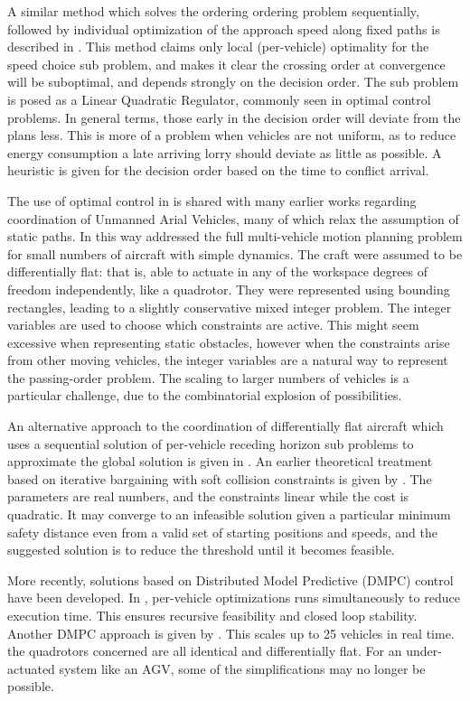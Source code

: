 A similar method which solves the ordering ordering problem sequentially, followed by individual optimization of the approach speed along fixed paths is described in \cite{DeCampos2017}. This method claims only local (per-vehicle) optimality for the speed choice sub problem, and makes it clear the crossing order at convergence will be suboptimal, and depends strongly on the decision order. The sub problem is posed as a Linear Quadratic Regulator, commonly seen in optimal control problems. In general terms, those early in the decision order will deviate from the plans less. This is more of a problem when vehicles are not uniform, as to reduce energy consumption a late arriving lorry should deviate as little as possible. A heuristic is given for the decision order based on the time to conflict arrival.

The use of optimal control in \cite{DeCampos2017} is shared with many earlier works regarding coordination of Unmanned Arial Vehicles, many of which relax the assumption of static paths. In this way \cite{Schouwenaars2004} addressed the full multi-vehicle motion planning problem for small numbers of aircraft with simple dynamics. The craft were assumed to be differentially flat: that is, able to actuate in any of the workspace degrees of freedom independently, like a quadrotor. They were represented using bounding rectangles, leading to a slightly conservative mixed integer problem. The integer variables are used to choose which constraints are active. This might seem excessive when representing static obstacles, however when the constraints arise from other moving vehicles, the integer variables are a natural way to represent the passing-order problem. The scaling to larger numbers of vehicles is a particular challenge, due to the combinatorial explosion of possibilities.

An alternative approach to the coordination of differentially flat aircraft which uses a sequential solution of per-vehicle receding horizon sub problems to approximate the global solution is given in \cite{Keviczky2008}. An earlier theoretical treatment based on iterative bargaining with soft collision constraints is given by \cite{Inalhan2002}. The parameters are real numbers, and the constraints linear while the cost is quadratic. It may converge to an infeasible solution given a particular minimum safety distance even from a valid set of starting positions and speeds, and the suggested solution is to reduce the threshold until it becomes feasible.  

More recently, solutions based on Distributed Model Predictive (DMPC) control have been developed. In \cite{Dai2017}, per-vehicle optimizations runs simultaneously to reduce execution time. This ensures recursive feasibility and closed loop stability. Another DMPC approach is given by \cite{Luis2018}. This scales up to 25 vehicles in real time. the quadrotors concerned are all identical and differentially flat. For an under-actuated system like an AGV, some of the simplifications may no longer be possible. 

